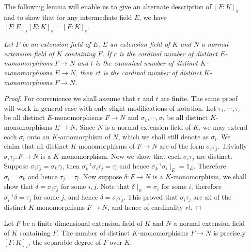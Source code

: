 The following lemma will enable us to give an alternate description of $[F:K]_s$ and to show that for any intermediate field $E$, we have $[F:E]_s[E:K]_s=[F:K]_s$.
\begin{lemma}\em
Let $F$ be an extension field of $E$, $E$ an extension field of $K$ and $N$ a normal extension field of $K$ containing $F$. If $r$ is the cardinal number of distinct $E$-monomorphisms $F\to N$ and $t$ is the canonical number of distinct $K$-monomorphisms $E\to N$, then $rt$ is the cardinal number of distinct $K$-monomorphisms $F\to N$.
\end{lemma}
\begin{proof}
For convenience we shall assume that $r$ and $t$ are finite. The same proof will work in general case with only slight modifications of notation. Let $\tau_1,\cdots,\tau_r$ be all distinct $E$-monomorphisms $F\to N$ and $\sigma_1,\cdots,\sigma_t$ be all distinct $K$-monomorphisms $E\to N$. Since $N$ is a normal extension field of $K$, we may extend each $\sigma_i$ onto an $K$-automorphism of $N$, which we shall still denote as $\sigma_i$. We claim that all distinct $K$-monomorphisms of $F\to N$ are of the form $\sigma_i\tau_j$. Trivially $\sigma_i\tau_j:F\to N$ is a $K$-monomorphism. Now we show that each $\sigma_i\tau_j$ are distinct. Suppose $\sigma_i\tau_j=\sigma_k\tau_l$, then $\sigma_k^{-1}\sigma_i\tau_j=\tau_l$ and hence $\sigma_k^{-1}\sigma_i\mid_E=1_E$. Therefore $\sigma_i=\sigma_k$ and hence $\tau_j=\tau_l$. Now suppose $\delta:F\to N$ is a $K$-monomorphism, we shall show that $\delta=\sigma_i\tau_j$ for some $i,j$. Note that $\delta\mid_E=\sigma_i$ for some $i$, therefore $\sigma_i^{-1}\delta=\tau_j$ for some $j$, and hence $\delta=\sigma_i\tau_j$. This proved that $\sigma_i\tau_j$ are all of the distinct $K$-monomorphisms $F\to N$, and hence of cardinality $rt$.
\end{proof}
\begin{proposition}
Let $F$ be a finite dimensional extension field of $K$ and $N$ a normal extension field of $K$ containing $F$. The number of distinct $K$-monomorphisms $F\to N$ is precisely $[F:K]_s$, the separable degree of $F$ over $K$.
\end{proposition}
